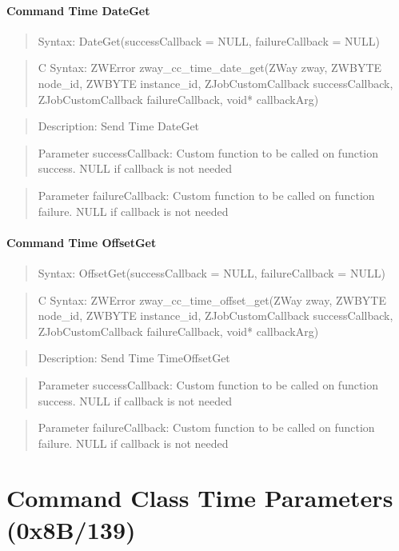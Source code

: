 \paragraph{Command Time DateGet}
\begin{quote}Syntax: DateGet(successCallback = NULL, failureCallback = NULL)\end{quote}
\begin{quote}C Syntax: ZWError zway\_cc\_time\_date\_get(ZWay zway, ZWBYTE node\_id, ZWBYTE instance\_id, ZJobCustomCallback successCallback, ZJobCustomCallback failureCallback, void* callbackArg)\end{quote}
\begin{quote}Description: Send Time DateGet\end{quote}
\begin{quote}Parameter successCallback: Custom function to be called on function success. NULL if callback is not needed\end{quote}
\begin{quote}Parameter failureCallback: Custom function to be called on function failure. NULL if callback is not needed\end{quote}


\paragraph{Command Time OffsetGet}
\begin{quote}Syntax: OffsetGet(successCallback = NULL, failureCallback = NULL)\end{quote}
\begin{quote}C Syntax: ZWError zway\_cc\_time\_offset\_get(ZWay zway, ZWBYTE node\_id, ZWBYTE instance\_id, ZJobCustomCallback successCallback, ZJobCustomCallback failureCallback, void* callbackArg)\end{quote}
\begin{quote}Description: Send Time TimeOffsetGet\end{quote}
\begin{quote}Parameter successCallback: Custom function to be called on function success. NULL if callback is not needed\end{quote}
\begin{quote}Parameter failureCallback: Custom function to be called on function failure. NULL if callback is not needed\end{quote}



\section{Command Class Time Parameters (0x8B/139)}

